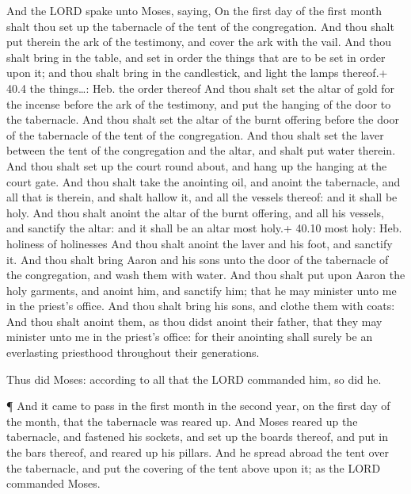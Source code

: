  And the LORD spake unto Moses, saying,  On the
first day of the first month shalt thou set up the tabernacle of the
tent of the congregation.  And thou shalt put therein the
ark of the testimony, and cover the ark with the vail.  And
thou shalt bring in the table, and set in order the things that are to
be set in order upon it; and thou shalt bring in the candlestick, and
light the lamps thereof.+ 40.4 the things\ldots: Heb. the order thereof
 And thou shalt set the altar of gold for the incense before
the ark of the testimony, and put the hanging of the door to the
tabernacle.  And thou shalt set the altar of the burnt
offering before the door of the tabernacle of the tent of the
congregation.  And thou shalt set the laver between the tent
of the congregation and the altar, and shalt put water therein.
 And thou shalt set up the court round about, and hang up
the hanging at the court gate.  And thou shalt take the
anointing oil, and anoint the tabernacle, and all that is therein, and
shalt hallow it, and all the vessels thereof: and it shall be holy.
 And thou shalt anoint the altar of the burnt offering, and
all his vessels, and sanctify the altar: and it shall be an altar most
holy.+ 40.10 most holy: Heb. holiness of holinesses  And
thou shalt anoint the laver and his foot, and sanctify it. 
And thou shalt bring Aaron and his sons unto the door of the tabernacle
of the congregation, and wash them with water.  And thou
shalt put upon Aaron the holy garments, and anoint him, and sanctify
him; that he may minister unto me in the priest's office. 
And thou shalt bring his sons, and clothe them with coats: 
And thou shalt anoint them, as thou didst anoint their father, that they
may minister unto me in the priest's office: for their anointing shall
surely be an everlasting priesthood throughout their generations.

 Thus did Moses: according to all that the LORD commanded
him, so did he.

 ¶ And it came to pass in the first month in the second
year, on the first day of the month, that the tabernacle was reared up.
 And Moses reared up the tabernacle, and fastened his
sockets, and set up the boards thereof, and put in the bars thereof, and
reared up his pillars.  And he spread abroad the tent over
the tabernacle, and put the covering of the tent above upon it; as the
LORD commanded Moses.

